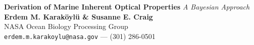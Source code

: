 \documentclass[a0,portrait]{a0poster}
\begin{document}


\begin{minipage}[b]{0.75\linewidth}
\veryHuge \color{NavyBlue} \textbf{Derivation of Marine Inherent Optical Properties}
\Huge \color{Black} \textit{A Bayesian Approach}\\[2cm] %
\huge \textbf{Erdem M. Karak{\"o}yl{\"u} \& Susanne E. Craig}\\[0.5cm] %
\huge NASA Ocean Biology Processing Group\\[0.4cm] %
\Large \texttt{erdem.m.karakoylu@nasa.gov} --- (301) 286-0501\\
\end{minipage}
%
\end{document}
